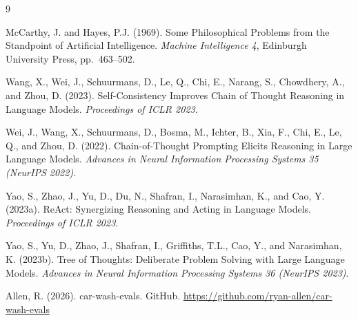 \documentclass[11pt]{article}
\begin{document}

\begin{thebibliography}{9}

McCarthy, J. and Hayes, P.J. (1969).
\newblock Some Philosophical Problems from the Standpoint of Artificial Intelligence.
\newblock \textit{Machine Intelligence 4}, Edinburgh University Press, pp.~463--502.

Wang, X., Wei, J., Schuurmans, D., Le, Q., Chi, E., Narang, S., Chowdhery, A., and Zhou, D. (2023).
\newblock Self-Consistency Improves Chain of Thought Reasoning in Language Models.
\newblock \textit{Proceedings of ICLR 2023}.

Wei, J., Wang, X., Schuurmans, D., Bosma, M., Ichter, B., Xia, F., Chi, E., Le, Q., and Zhou, D. (2022).
\newblock Chain-of-Thought Prompting Elicits Reasoning in Large Language Models.
\newblock \textit{Advances in Neural Information Processing Systems 35 (NeurIPS 2022)}.

Yao, S., Zhao, J., Yu, D., Du, N., Shafran, I., Narasimhan, K., and Cao, Y. (2023a).
\newblock ReAct: Synergizing Reasoning and Acting in Language Models.
\newblock \textit{Proceedings of ICLR 2023}.

Yao, S., Yu, D., Zhao, J., Shafran, I., Griffiths, T.L., Cao, Y., and Narasimhan, K. (2023b).
\newblock Tree of Thoughts: Deliberate Problem Solving with Large Language Models.
\newblock \textit{Advances in Neural Information Processing Systems 36 (NeurIPS 2023)}.

Allen, R. (2026).
\newblock car-wash-evals.
\newblock GitHub. \url{https://github.com/ryan-allen/car-wash-evals}

\end{thebibliography}
\end{document}
